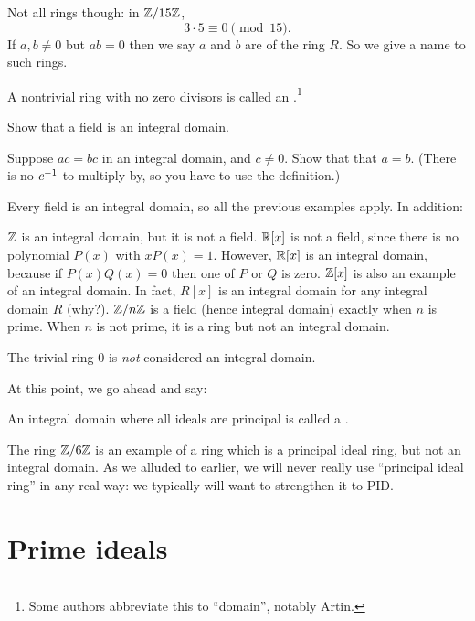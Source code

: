 Not all rings though: in $\mathbb Z/15\mathbb Z$,
\[ 3 \cdot 5 \equiv 0 \pmod{15}. \]
If $a, b \neq 0$ but $ab=0$ then we say $a$ and $b$ are 
of the ring $R$.
So we give a name to such rings.
\begin{definition}
	A nontrivial ring with no zero divisors
	is called an .\footnote{Some
		authors abbreviate this to ``domain'', notably Artin.}
\end{definition}
\begin{ques}
	Show that a field is an integral domain.
\end{ques}
\begin{exercise}
	Suppose $ac = bc$ in an integral domain, and $c \neq 0$.
	Show that that $a = b$.
	(There is no $c^{-1}$ to multiply by,
	so you have to use the definition.)
\end{exercise}

\begin{example}
	Every field is an integral domain,
	so all the previous examples apply.
	In addition:
	\begin{enumerate}[(a)]
		\ii $\mathbb Z$ is an integral domain, but it is not a field.
		\ii $\mathbb R[x]$ is not a field,
		since there is no polynomial $P(x)$ with $xP(x) = 1$.
		However, $\mathbb R[x]$ is an integral domain,
		because if $P(x) Q(x) = 0$ then one of $P$ or $Q$ is zero.
		\ii $\mathbb Z[x]$ is also an example of an integral domain.
		In fact, $R[x]$ is an integral domain for any integral domain $R$ (why?).
		\ii $\mathbb Z/n\mathbb Z$ is a field (hence integral domain)
		exactly when $n$ is prime.
		When $n$ is not prime, it is a ring but not an integral domain.
	\end{enumerate}
	The trivial ring $0$ is \emph{not} considered an integral domain.
\end{example}

At this point, we go ahead and say:
\begin{definition}
	An integral domain where all ideals are principal
	is called a .
\end{definition}
The ring $\mathbb Z/6\mathbb Z$ is an example of a ring
which is a principal ideal ring, but not an integral domain.
As we alluded to earlier, we will never really use ``principal ideal ring''
in any real way: we typically will want to strengthen it to PID.

\section{Prime ideals}

